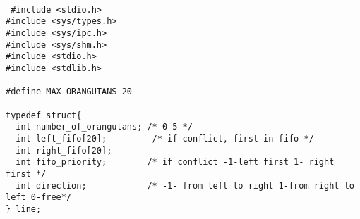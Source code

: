 \documentclass[a4paper,15pt]{article}
\begin{document}
\begin{lstlisting}[style=CStyle, label=some-code, caption=line.h]
	
 #include <stdio.h>
#include <sys/types.h>
#include <sys/ipc.h>
#include <sys/shm.h>
#include <stdio.h>
#include <stdlib.h>

#define MAX_ORANGUTANS 20

typedef struct{
  int number_of_orangutans; /* 0-5 */
  int left_fifo[20];         /* if conflict, first in fifo */        
  int right_fifo[20];
  int fifo_priority;        /* if conflict -1-left first 1- right first */
  int direction;            /* -1- from left to right 1-from right to left 0-free*/
} line;
	
\end{lstlisting}
\end{document}
